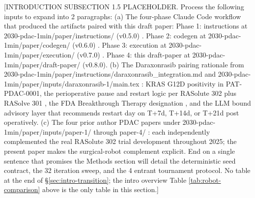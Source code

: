 [INTRODUCTION SUBSECTION 1.5 PLACEHOLDER. Process the following inputs to expand into 2 paragraphs:
(a) The four-phase Claude Code workflow that produced the artifacts paired with this draft paper:
    Phase 1: instructions at 2030-pdac-1min/paper/instructions/ (v0.5.0) \cite{pdac-instructions-v050}.
    Phase 2: codegen at 2030-pdac-1min/paper/codegen/ (v0.6.0) \cite{pdac-codegen-v060}.
    Phase 3: execution at 2030-pdac-1min/paper/execution/ (v0.7.0) \cite{pdac-execution-v070}.
    Phase 4: this draft-paper at 2030-pdac-1min/paper/draft-paper/ (v0.8.0).
(b) The Daraxonrasib pairing rationale from 2030-pdac-1min/paper/instructions/daraxonrasib_integration.md and 2030-pdac-1min/paper/inputs/daraxonrasib-1/main.tex \cite{kawchak_2025_18099351}: KRAS G12D positivity in PAT-PDAC-0001, the perioperative pause and restart logic per RASolute 302 plus RASolve 301 \cite{rasolute302, rasolve301}, the FDA Breakthrough Therapy designation \cite{rev-fda-breakthrough}, and the LLM bound advisory layer that recommends restart day on T+7d, T+14d, or T+21d post operatively.
(c) The four prior author PDAC papers under 2030-pdac-1min/paper/inputs/paper-1/ through paper-4/ \cite{kawchak_2025_15735068, kawchak_2025_16415815, kawchak_2025_17001137, kawchak_2025_17239510}: each independently complemented the real RASolute 302 trial development throughout 2025; the present paper makes the surgical-robot complement explicit.
End on a single sentence that promises the Methods section will detail the deterministic seed contract, the 32 iteration sweep, and the 4 entrant tournament protocol. No table at the end of \S \ref{sec:intro-transition}; the intro overview Table \ref{tab:robot-comparison} above is the only table in this section.]

